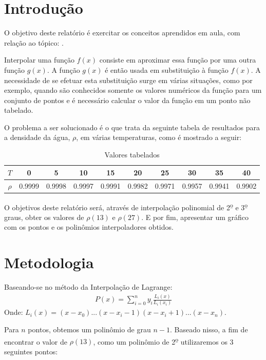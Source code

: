 \documentclass[12pt, hidelinks]{article}
\makeatletter
\let\thetitle\@title
\makeatother
\begin{document}
\section{Introdução}

O objetivo deste relatório é exercitar os conceitos aprendidos em aula, com relação ao tópico: \thetitle.

Interpolar uma função $f(x)$ consiste em aproximar essa função por uma outra função $g(x)$. A função $g(x)$
é então usada em substituição à função $f(x)$.
A necessidade de se efetuar esta substituição surge em várias situações, como por exemplo, quando são
conhecidos somente os valores numéricos da função para um conjunto de pontos e é necessário calcular o
valor da função em um ponto não tabelado.

O problema a ser solucionado é o que trata da seguinte tabela de resultados para a densidade da água, $\rho$, em várias temperaturas, como é mostrado a seguir:
\begin{table}[h]
  \centering
  \begin{tabular}{|c|c|c|c|c|c|c|c|c|c|}
    \hline
      $T$ & 0 & 5 & 10 & 15 & 20 & 25 & 30 & 35 & 40\\
    \hline
      $\rho$ & 0.9999 & 0.9998 & 0.9997 & 0.9991 & 0.9982 & 0.9971 & 0.9957 & 0.9941 & 0.9902\\
    \hline
  \end{tabular}
  \caption{Valores tabelados}
\end{table}

O objetivos deste relatório será, através de interpolação polinomial de 2\textsuperscript{\b{o}} e 3\textsuperscript{\b{o}} graus, obter os valores de $\rho(13)$ e $\rho(27)$. E por fim, apresentar um gráfico com os pontos e os polinômios interpoladores obtidos.

\section{Metodologia}

Baseando-se no método da Interpolação de Lagrange:
\begin{eqnarray}\label{eq:lagrange}
  P(x) = \sum\limits_{i=0}^{n}y_i \frac{L_i(x)}{L_i(x_i)}
\end{eqnarray}
Onde: $L_i(x) = (x - x_0) ... (x - x_i-1)(x - x_i+1) ... (x - x_n)$.

Para $n$ pontos, obtemos um polinômio de grau $n-1$. Baseado nisso, a fim de encontrar o valor de $\rho(13)$, como um polinômio de 2\textsuperscript{\b{o}} utilizaremos os 3 seguintes pontos:
\end{document}
